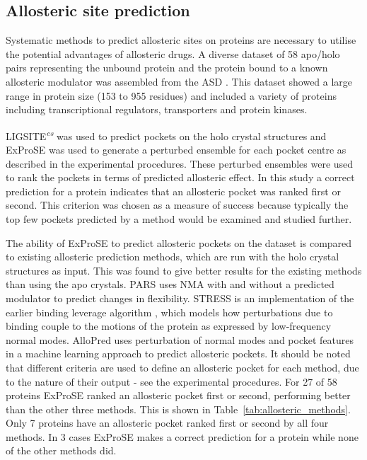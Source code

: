 \subsection{Allosteric site prediction}

Systematic methods to predict allosteric sites on proteins are necessary to utilise the potential advantages of allosteric drugs.
A diverse dataset of 58 apo/holo pairs representing the unbound protein and the protein bound to a known allosteric modulator was assembled from the ASD \cite{Shen2016}.
This dataset showed a large range in protein size (153 to 955 residues) and included a variety of proteins including transcriptional regulators, transporters and protein kinases.

LIGSITE\textsuperscript{\it cs} was used to predict pockets on the holo crystal structures and ExProSE was used to generate a perturbed ensemble for each pocket centre as described in the experimental procedures.
These perturbed ensembles were used to rank the pockets in terms of predicted allosteric effect.
In this study a correct prediction for a protein indicates that an allosteric pocket was ranked first or second.
This criterion was chosen as a measure of success because typically the top few pockets predicted by a method would be examined and studied further.

The ability of ExProSE to predict allosteric pockets on the dataset is compared to existing allosteric prediction methods, which are run with the holo crystal structures as input.
This was found to give better results for the existing methods than using the apo crystals.
PARS \cite{Panjkovich2014} uses NMA with and without a predicted modulator to predict changes in flexibility.
STRESS \cite{Clarke2016} is an implementation of the earlier binding leverage algorithm \cite{Mitternacht2011}, which models how perturbations due to binding couple to the motions of the protein as expressed by low-frequency normal modes.
AlloPred \cite{Greener2015} uses perturbation of normal modes and pocket features in a machine learning approach to predict allosteric pockets.
It should be noted that different criteria are used to define an allosteric pocket for each method, due to the nature of their output - see the experimental procedures.
For 27 of 58 proteins ExProSE ranked an allosteric pocket first or second, performing better than the other three methods.
This is shown in Table~\ref{tab:allosteric_methods}.
Only 7 proteins have an allosteric pocket ranked first or second by all four methods.
In 3 cases ExProSE makes a correct prediction for a protein while none of the other methods did.

